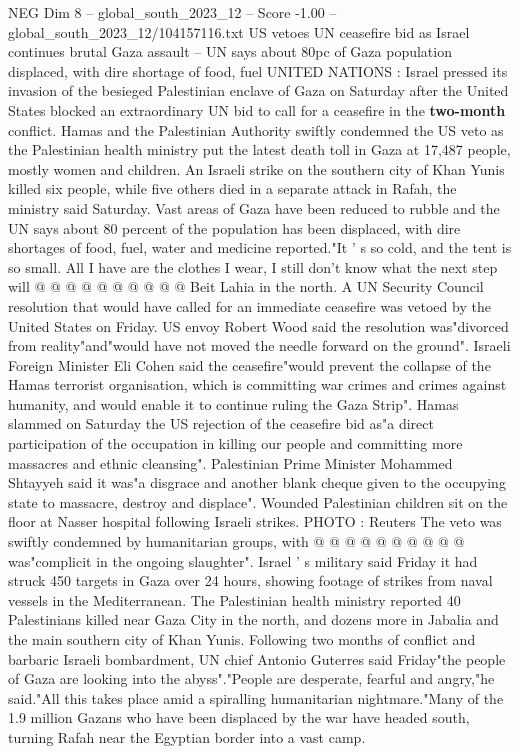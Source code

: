 \begin{textsample}{NEG Dim 8 – global\_south\_2023\_12 – Score -1.00 – global\_south\_2023\_12/104157116.txt}  \label{ex:f8_neg_222}
US vetoes UN ceasefire bid as Israel continues brutal Gaza assault -- UN says about 80pc of Gaza population displaced, with dire shortage of food, fuel UNITED NATIONS : Israel pressed its invasion of the besieged Palestinian enclave of Gaza on Saturday after the United States blocked an extraordinary UN bid to call for a ceasefire in the \textbf{two-month} conflict.
Hamas and the Palestinian Authority swiftly condemned the US veto as the Palestinian health ministry put the latest death toll in Gaza at 17,487 people, mostly women and children.
An Israeli strike on the southern city of Khan Yunis killed six people, while five others died in a separate attack in Rafah, the ministry said Saturday.
Vast areas of Gaza have been reduced to rubble and the UN says about 80 percent of the population has been displaced, with dire shortages of food, fuel, water and medicine reported."It ' s so cold, and the tent is so small.
All I have are the clothes I wear, I still don't know what the next step will @ @ @ @ @ @ @ @ @ @ Beit Lahia in the north.
A UN Security Council resolution that would have called for an immediate ceasefire was vetoed by the United States on Friday.
US envoy Robert Wood said the resolution was"divorced from reality"and"would have not moved the needle forward on the ground".
Israeli Foreign Minister Eli Cohen said the ceasefire"would prevent the collapse of the Hamas terrorist organisation, which is committing war crimes and crimes against humanity, and would enable it to continue ruling the Gaza Strip".
Hamas slammed on Saturday the US rejection of the ceasefire bid as"a direct participation of the occupation in killing our people and committing more massacres and ethnic cleansing".
Palestinian Prime Minister Mohammed Shtayyeh said it was"a disgrace and another blank cheque given to the occupying state to massacre, destroy and displace".
Wounded Palestinian children sit on the floor at Nasser hospital following Israeli strikes.
PHOTO : Reuters The veto was swiftly condemned by humanitarian groups, with @ @ @ @ @ @ @ @ @ @ was"complicit in the ongoing slaughter".
Israel ' s military said Friday it had struck 450 targets in Gaza over 24 hours, showing footage of strikes from naval vessels in the Mediterranean.
The Palestinian health ministry reported 40 Palestinians killed near Gaza City in the north, and dozens more in Jabalia and the main southern city of Khan Yunis.
Following two months of conflict and barbaric Israeli bombardment, UN chief Antonio Guterres said Friday"the people of Gaza are looking into the abyss"."People are desperate, fearful and angry,"he said."All this takes place amid a spiralling humanitarian nightmare."Many of the 1.9 million Gazans who have been displaced by the war have headed south, turning Rafah near the Egyptian border into a vast camp.

\end{textsample}

